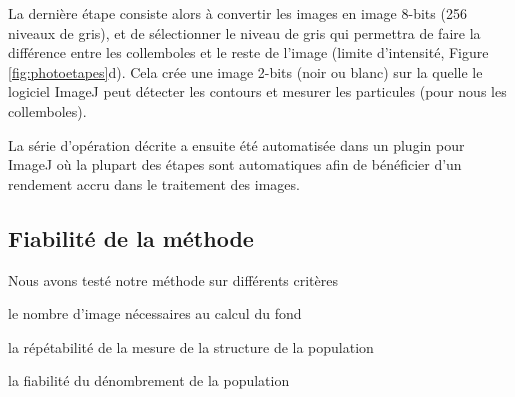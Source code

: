 La dernière étape consiste alors à convertir les images en image 8-bits (256
niveaux de gris), et de sélectionner le niveau de gris qui permettra de faire la
différence entre les collemboles et le reste de l'image (limite d'intensité,
Figure \ref{fig:photoetapes}d). Cela crée une image 2-bits (noir ou blanc) sur
la quelle le logiciel ImageJ peut détecter les contours et mesurer les
particules (pour nous les collemboles).

La série d'opération décrite a ensuite été automatisée dans un plugin pour
ImageJ où la plupart des étapes sont automatiques afin de bénéficier d'un
rendement accru dans le traitement des images.

\subsection{Fiabilité de la méthode}

Nous avons testé notre méthode sur différents critères \begin{enumerate*}[label=(\roman*), before=\unskip{ : }, itemjoin={{ ; }},
itemjoin*={{ ; et }}] 
\item le nombre d'image nécessaires au calcul du fond
\item la répétabilité de la mesure de la structure de la population
\item la fiabilité du dénombrement de la population
\end{enumerate*}

